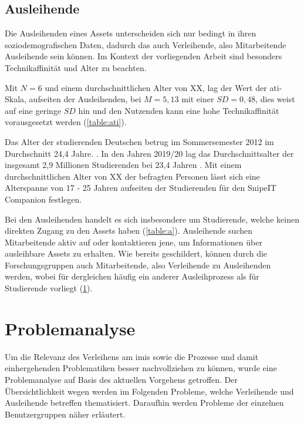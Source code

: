 \subsection{Ausleihende}
Die Ausleihenden eines Assets unterscheiden sich nur bedingt in ihren soziodemografischen Daten,
dadurch das auch Verleihende, also Mitarbeitende Ausleihende sein können. Im Kontext der
vorliegenden Arbeit sind besonders Technikaffinität und Alter zu beachten.

Mit $N=6$ und einem durchschnittlichen Alter von XX, lag der Wert der \ac{ati}-Skala, aufseiten der
Ausleihenden, bei $M=5,13$ mit einer $SD=0,48$, dies weist auf eine geringe $SD$ hin und den
Nutzenden kann eine hohe Technikaffinität vorausgesetzt werden  (\ref{table:ati}).

Das Alter der studierenden Deutschen betrug im Sommersemester 2012 im Durchschnitt 24,4
Jahre. \cite{middendorff2017wirtschaftliche}. In den Jahren 2019/20 lag das Durchschnittsalter der
insgesamt 2,9 Millionen Studierenden bei 23,4 Jahren \cite{noauthor_studierende_nodate}. Mit einem
durchschnittlichen Alter von XX der befragten Personen lässt sich eine Alterspanne von 17 - 25
Jahren aufseiten der Studierenden für den SnipeIT Companion festlegen.

Bei den Ausleihenden handelt es sich insbesondere um Studierende, welche keinen direkten Zugang zu
den Assets haben (\ref{table:a}). Ausleihende suchen Mitarbeitende aktiv auf oder kontaktieren jene,
um Informationen über ausleihbare Assets zu erhalten. Wie bereits geschildert, können durch die
Forschungsgruppen auch Mitarbeitende, also Verleihende zu Ausleihenden werden, wobei für dergleichen
häufig ein anderer Ausleihprozess als für Studierende vorliegt (\ref{section:iststand}).


\section{Problemanalyse}
\label{section:iststand}

Um die Relevanz des Verleihens am \ac{imis} sowie die Prozesse und damit einhergehenden
Problematiken besser nachvollziehen zu können, wurde eine Problemanalyse auf Basis des aktuellen
Vorgehens getroffen. Der Übersichtlichkeit wegen werden im Folgenden Probleme, welche Verleihende
und Ausleihende betreffen thematisiert. Daraufhin werden Probleme der einzelnen Benutzergruppen
näher erläutert.

